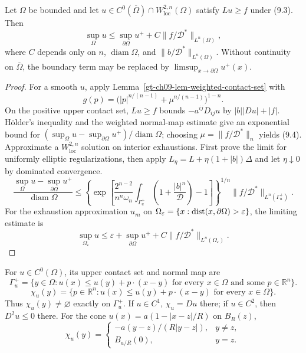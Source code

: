 \begin{theorem}
\label{gt-ch09-thm-aleksandrov-maximum-principle}
Let $\Omega$ be bounded and let
$u\in C^0(\overline\Omega)\cap W^{2,n}_{\mathrm{loc}}(\Omega)$ satisfy
$Lu\ge f$ under (9.3).  Then
\begin{equation}\tag{9.4}
\sup_\Omega u\le\sup_{\partial\Omega}u^+
+C\|f/\mathcal D^*\|_{L^n(\Omega)},
\end{equation}
where $C$ depends only on $n$, $\operatorname{diam}\Omega$, and
$\|b/\mathcal D^*\|_{L^n(\Omega)}$.  Without continuity on
$\overline\Omega$, the boundary term may be replaced by
$\limsup_{x\to\partial\Omega}u^+(x)$.
\end{theorem}
\begin{proof}
\sketch For a smooth $u$, apply Lemma~\ref{gt-ch09-lem-weighted-contact-set}
with
\[
g(p)=\bigl(|p|^{n/(n-1)}+\mu^{n/(n-1)}\bigr)^{1-n}.
\]
On the positive upper contact set, $Lu\ge f$ bounds
$-a^{ij}D_{ij}u$ by $|b||Du|+|f|$.  H\"older's inequality and the weighted
normal-map estimate give an exponential bound for
$(\sup_\Omega u-\sup_{\partial\Omega}u^+)/\operatorname{diam}\Omega$;
choosing $\mu=\|f/\mathcal D^*\|_n$ yields (9.4).  Approximate a
$W^{2,n}_{\mathrm{loc}}$ solution on interior exhaustions.  First prove the
limit for uniformly elliptic regularizations, then apply
$L_\eta=L+\eta(1+|b|)\Delta$ and let $\eta\downarrow0$ by dominated
convergence.
\[
\frac{\sup_\Omega u-\sup_{\partial\Omega}u^+}
{\operatorname{diam}\Omega}
\le
\left\{
\exp\left[
\frac{2^{n-2}}{n^n\omega_n}
\int_{\Gamma_u^+}\left(1+\frac{|b|^n}{\mathcal D}\right)-1
\right]
\right\}^{1/n}
\|f/\mathcal D^*\|_{L^n(\Gamma_u^+)}.
\tag{9.14}
\]
For the exhaustion approximation $u_m$ on
$\Omega_\varepsilon=\{x:\operatorname{dist}(x,\partial\Omega)>\varepsilon\}$, the limiting
estimate is
\begin{equation}
\tag{9.15}
\sup_{\Omega_\varepsilon}u
\leq\varepsilon+\sup_{\partial\Omega}u^+
+C\|f/\mathcal D^*\|_{L^n(\Omega_\varepsilon)}.
\end{equation}
\end{proof}

For $u\in C^0(\Omega)$, its upper contact set and normal map are
\begin{equation}
\Gamma_u^+
 =\{y\in\Omega:u(x)\le u(y)+p\cdot(x-y)
\text{ for every }x\in\Omega\text{ and some }p\in\mathbb R^n\}.
\tag{9.5}
\end{equation}
\begin{equation}
\chi_u(y)
 =\{p\in\mathbb R^n:u(x)\le u(y)+p\cdot(x-y)
\text{ for every }x\in\Omega\}.
\tag{9.6}
\end{equation}
Thus $\chi_u(y)\ne\varnothing$ exactly on $\Gamma_u^+$.  If $u\in C^1$,
$\chi_u=Du$ there; if $u\in C^2$, then $D^2u\le0$ there.
For the cone $u(x)=a(1-|x-z|/R)$ on $B_R(z)$,
\begin{equation}
\tag{9.7}
\chi_u(y)=
\begin{cases}
-a(y-z)/(R|y-z|),&y\ne z,\\
B_{a/R}(0),&y=z.
\end{cases}
\end{equation}

